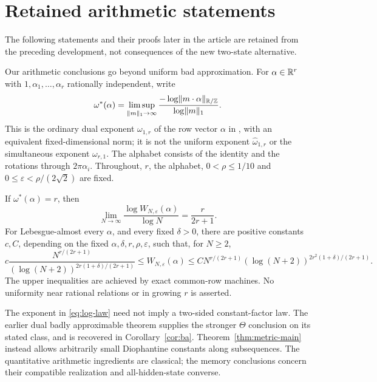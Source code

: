 \section{Retained arithmetic statements}\label{sec:retained49}
The following statements and their proofs later in the article are
retained from the preceding development, not consequences of the new
two-state alternative.

Our arithmetic conclusions go beyond uniform bad approximation. For $\alpha\in\mathbb R^r$ with $1,\alpha_1,\ldots,\alpha_r$ rationally independent, write
\begin{equation}\label{eq:type-intro}
 \omega^*(\alpha)=\limsup_{\lVert m\rVert_1\to\infty}
       \frac{-\log\lVert m\cdot\alpha\rVert_{\mathbb R/\mathbb Z}}{\log\lVert m\rVert_1}.
\end{equation}
This is the ordinary dual exponent $\omega_{1,r}$ of the row vector $\alpha$ in \cite[Definition 1]{BL06}, with an equivalent fixed-dimensional norm; it is not the uniform exponent $\widehat\omega_{1,r}$ or the simultaneous exponent $\omega_{r,1}$. The alphabet consists of the identity and the rotations through $2\pi\alpha_i$. Throughout, $r$, the alphabet, $0<\rho\le1/10$ and
$0\le\varepsilon<\rho/(2\sqrt2)$ are fixed.

\begin{theorem}\label{thm:metric-main}
If $\omega^*(\alpha)=r$, then
\begin{equation}\label{eq:log-law}
 \lim_{N\to\infty}\frac{\log W_{N,\varepsilon}(\alpha)}{\log N}
                         =\frac{r}{2r+1}.
\end{equation}
For Lebesgue-almost every $\alpha$, and every fixed $\delta>0$, there are positive constants $c,C$, depending on the fixed $\alpha,\delta,r,\rho,\varepsilon$, such that, for $N\ge2$,
\begin{equation}\label{eq:ae-log-bounds}
 c\frac{N^{r/(2r+1)}}{(\log(N+2))^{2r(1+\delta)/(2r+1)}}
 \le W_{N,\varepsilon}(\alpha)
 \le C N^{r/(2r+1)}(\log(N+2))^{2r^2(1+\delta)/(2r+1)}.
\end{equation}
The upper inequalities are achieved by exact common-row machines. No uniformity near rational relations or in growing $r$ is asserted.
\end{theorem}

The exponent in \eqref{eq:log-law} need not imply a two-sided constant-factor law. The earlier dual badly approximable theorem supplies the stronger $\Theta$ conclusion on its stated class, and is recovered in Corollary~\ref{cor:ba}. Theorem~\ref{thm:metric-main} instead allows arbitrarily small Diophantine constants along subsequences. The quantitative arithmetic ingredients are classical; the memory conclusions concern their compatible realization and all-hidden-state converse.

